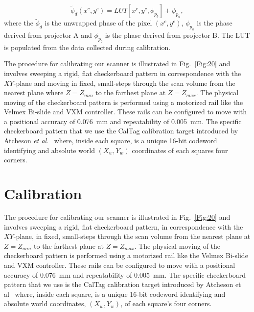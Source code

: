 \documentclass[]{spie}  %
\begin{document}
\begin{equation} \label{eq:1.16}
  	\tilde{\phi}_d(x^c, y^c) = LUT[x^c, y^c, \phi_{p_b}] + \phi_{p_a},
  \end{equation}
where the $\tilde{\phi}_d$ is the unwrapped phase of the pixel $(x^c, y^c)$, $\phi_{p_a}$ is the phase derived from projector A and $\phi_{p_b}$ is the phase derived from projector B.
The LUT is populated from the data collected during calibration.

The procedure for calibrating our scanner is illustrated in Fig.~\ref{Fig:20} and involves sweeping a rigid, flat checkerboard pattern in correspondence with the $XY$-plane and moving in fixed, small-steps through the scan volume from the nearest plane where $Z = Z_{min}$ to the farthest plane at $Z = Z_{max}$.  The physical moving of the checkerboard pattern is performed using a motorized rail like the Velmex Bi-slide and VXM controller.  These rails can be configured to move with a positional accuracy of 0.076~mm and repeatability of 0.005~mm.  The specific checkerboard pattern that we use the CalTag calibration target introduced by Atcheson \textit{et al}.~\cite{atch10} where, inside each square, is a unique 16-bit codeword identifying and absolute world $(X_w,Y_w)$ coordinates of each squares four corners.
\section{Calibration}
The procedure for calibrating our scanner is illustrated in Fig.~\ref{Fig:20} and involves sweeping a rigid, flat checkerboard pattern, in correspondence with the $XY$-plane, in fixed, small-steps through the scan volume from the nearest plane at $Z = Z_{min}$ to the farthest plane at $Z = Z_{max}$.  The physical moving of the checkerboard pattern is performed using a motorized rail like the Velmex Bi-slide and VXM controller.  These rails can be configured to move with a positional accuracy of 0.076~mm and repeatability of 0.005~mm.  The specific checkerboard pattern that we use is the CalTag calibration target introduced by Atcheson et al~\cite{atch10} where, inside each square, is a unique 16-bit codeword identifying and absolute world coordinates,  $(X_w,Y_w)$, of each square's four corners.
\end{document}
